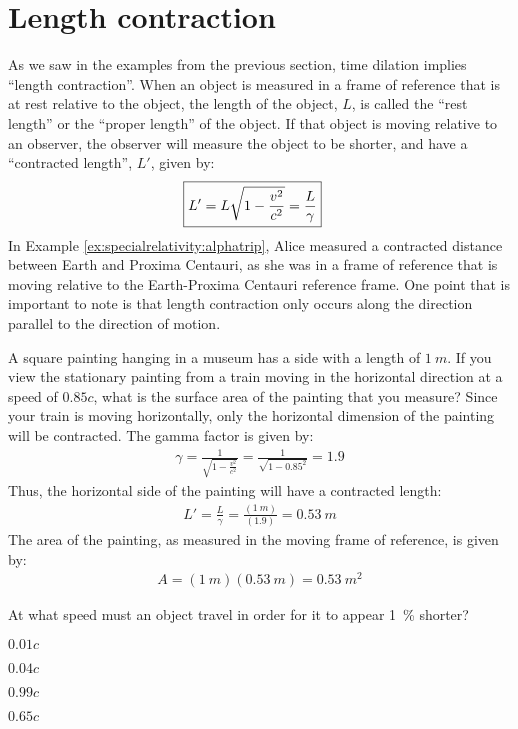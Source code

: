 \section{Length contraction}
As we saw in the examples from the previous section, time dilation implies ``length contraction''. When an object is measured in a frame of reference that is at rest relative to the object, the length of the object, $L$, is called the ``rest length'' or the ``proper length'' of the object. If that object is moving relative to an observer, the observer will measure the object to be shorter, and have a ``contracted length'', $L'$, given by:
\begin{align*}
\Aboxed{L'=L\sqrt{1-\frac{v^2}{c^2}} =\frac{L}{\gamma}}
\end{align*}
In Example \ref{ex:specialrelativity:alphatrip}, Alice measured a contracted distance between Earth and Proxima Centauri, as she was in a frame of reference that is moving relative to the Earth-Proxima Centauri reference frame. One point that is important to note is that length contraction only occurs along the direction parallel to the direction of motion.
\newpage
\begin{example}{A square painting hanging in a museum has a side with a length of $\SI{1}{m}$. If you view the stationary painting from a train moving in the horizontal direction at a speed of $0.85c$, what is the surface area of the painting that you measure?}
Since your train is moving horizontally, only the horizontal dimension of the painting will be contracted. The gamma factor is given by:
\begin{align*}
\gamma = \frac{1}{\sqrt{1-\frac{v^2}{c^2}}} =\frac{1}{\sqrt{1-0.85^2}}=1.9
\end{align*}
Thus, the horizontal side of the painting will have a contracted length:
\begin{align*}
L'=\frac{L}{\gamma}=\frac{(\SI{1}{m})}{(1.9)}=\SI{0.53}{m}
\end{align*}
The area of the painting, as measured in the moving frame of reference, is given by:
\begin{align*}
A= (\SI{1}{m})(\SI{0.53}{m})=\SI{0.53}{m^2}
\end{align*}
\end{example}
\begin{checkpoint}{}
	\begin{MCquestion}{At what speed must an object travel in order for it to appear \SI{1}{\percent} shorter?}
		\item $0.01c$
		\item $0.04c$ \correct
		\item $0.99c$
		\item $0.65c$
	\end{MCquestion}
\end{checkpoint}
